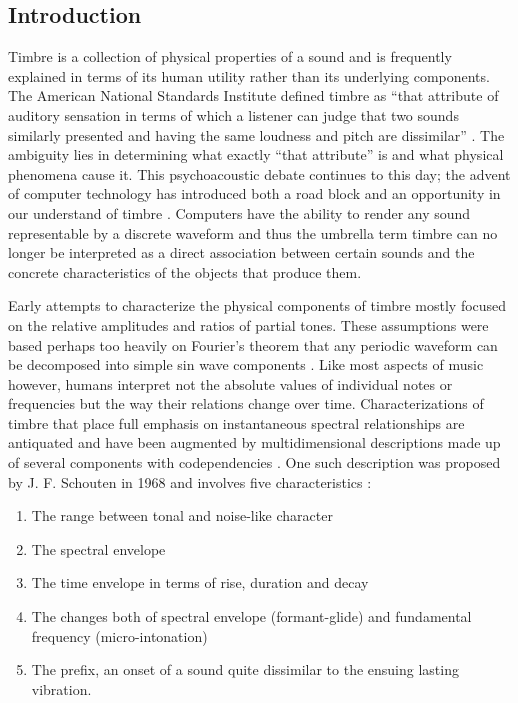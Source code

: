 \documentclass[12pt]{article}
\begin{document}
\subsection{Introduction}\label{TMINTRO}
Timbre is a collection of physical properties of a sound and is frequently explained in terms of its human utility rather than its underlying components. The American National Standards Institute defined timbre as ``that attribute of auditory sensation in terms of which a listener can judge that two sounds similarly presented and having the same loudness and pitch are dissimilar'' \citep{american1960american}. The ambiguity lies in determining what exactly ``that attribute'' is and what physical phenomena cause it. This psychoacoustic debate continues to this day; the advent of computer technology has introduced both a road block and an opportunity in our understand of timbre \citep{erickson1975sound}. Computers have the ability to render any sound representable by a discrete waveform and thus the umbrella term timbre can no longer be interpreted as a direct association between certain sounds and the concrete characteristics of the objects that produce them.

Early attempts to characterize the physical components of timbre mostly focused on the relative amplitudes and ratios of partial tones. These assumptions were based perhaps too heavily on Fourier's theorem that any periodic waveform can be decomposed into simple sin wave components \citep{helmholtz1857physiological, helmholtz1954sensations}. Like most aspects of music however, humans interpret not the absolute values of individual notes or frequencies but the way their relations change over time. Characterizations of timbre that place full emphasis on instantaneous spectral relationships are antiquated and have been augmented by multidimensional descriptions made up of several components with codependencies \citep{erickson1975sound}. One such description was proposed by J. F. Schouten in 1968 and involves five characteristics \citep{schouten1968perception, erickson1975sound}:
\begin{enumerate}
\item
The range between tonal and noise-like character
\item
The spectral envelope
\item
The time envelope in terms of rise, duration and decay
\item
The changes both of spectral envelope (formant-glide) and fundamental frequency (micro-intonation)
\item
The prefix, an onset of a sound quite dissimilar to the ensuing lasting vibration.
\end{enumerate}
\end{document}
